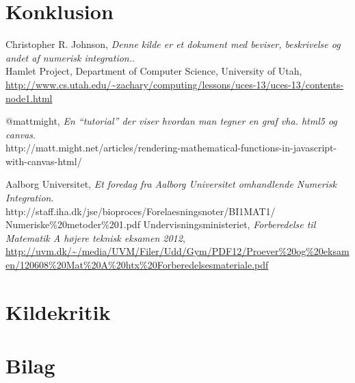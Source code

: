\documentclass[12pt]{article}
\numberwithin{equation}{section}
\begin{document}
\section{Konklusion}

\clearpage
{}
\begin{thebibliography}{9}

  	Christopher R. Johnson,
  	\emph{Denne kilde er et dokument med beviser, beskrivelse og andet af numerisk integration.}.\\
  	Hamlet Project, 
  	Department of Computer Science,
	University of Utah,
	\url{http://www.cs.utah.edu/~zachary/computing/lessons/uces-13/uces-13/contents-node1.html}
	
	@mattmight,
	\emph{En ``tutorial'' der viser hvordan man tegner en graf vha. html5 og canvas}.\\
	http://matt.might.net/articles/rendering-mathematical-functions-in-javascript-with-canvas-html/

	Aalborg Universitet,
	\emph{Et foredag fra Aalborg Universitet omhandlende Numerisk Integration}.\\
	http://staff.iha.dk/jse/bioproces/Forelaesningsnoter/BI1MAT1/\\Numeriske\%20metoder\%201.pdf
	Undervisningsministeriet,
	\emph{Forberedelse til Matematik A højere teknisk eksamen 2012},
	\url{http://uvm.dk/~/media/UVM/Filer/Udd/Gym/PDF12/Proever\%20og\%20eksamen/120608\%20Mat\%20A\%20htx\%20Forberedelsesmateriale.pdf}

\end{thebibliography}

\section{Kildekritik}
\section{Bilag}
\end{document}
